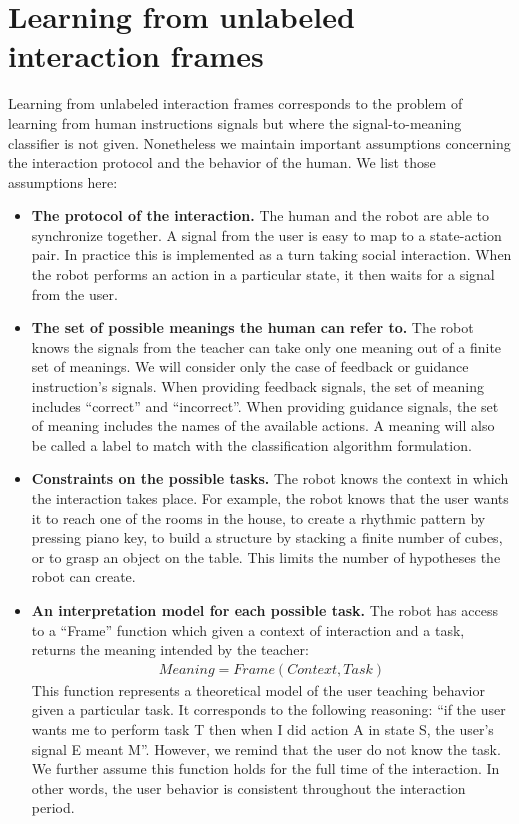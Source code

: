 

\section{Learning from unlabeled interaction frames}

Learning from unlabeled interaction frames corresponds to the problem of learning from human instructions signals but where the signal-to-meaning classifier is not given. Nonetheless we maintain important assumptions concerning the interaction protocol and the behavior of the human. We list those assumptions here:

\begin{itemize}

\item \textbf{The protocol of the interaction.} The human and the robot are able to synchronize together. A signal from the user is easy to map to a state-action pair. In practice this is implemented as a turn taking social interaction. When the robot performs an action in a particular state, it then waits for a signal from the user.

\item \textbf{The set of possible meanings the human can refer to.} The robot knows the signals from the teacher can take only one meaning out of a finite set of meanings. We will consider only the case of feedback or guidance instruction's signals. When providing feedback signals, the set of meaning includes ``correct'' and ``incorrect''. When providing guidance signals, the set of meaning includes the names of the available actions. A meaning will also be called a label to match with the classification algorithm formulation. 

\item \textbf{Constraints on the possible tasks.} The robot knows the context in which the interaction takes place. For example, the robot knows that the user wants it to reach one of the rooms in the house, to create a rhythmic pattern by pressing piano key, to build a structure by stacking a finite number of cubes, or to grasp an object on the table. This limits the number of hypotheses the robot can create.

\item \textbf{An interpretation model for each possible task.} The robot has access to a ``Frame'' function which given a context of interaction and a task, returns the meaning intended by the teacher:
%
\begin{eqnarray}
Meaning = Frame(Context, Task) \nonumber
\end{eqnarray}
%
This function represents a theoretical model of the user teaching behavior given a particular task. It corresponds to the following reasoning: ``if the user wants me to perform task T then when I did action A in state S, the user's signal E meant M''. However, we remind that the user do not know the task. We further assume this function holds for the full time of the interaction. In other words, the user behavior is consistent throughout the interaction period.


\end{itemize}
